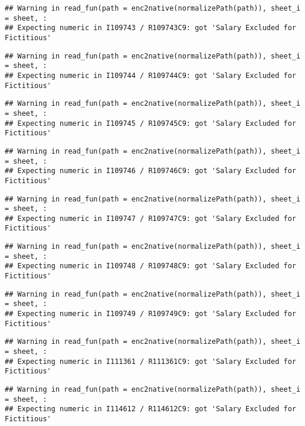 \documentclass[
]{article}
\begin{document}
\begin{verbatim}
## Warning in read_fun(path = enc2native(normalizePath(path)), sheet_i = sheet, :
## Expecting numeric in I109743 / R109743C9: got 'Salary Excluded for Fictitious'
\end{verbatim}

\begin{verbatim}
## Warning in read_fun(path = enc2native(normalizePath(path)), sheet_i = sheet, :
## Expecting numeric in I109744 / R109744C9: got 'Salary Excluded for Fictitious'
\end{verbatim}

\begin{verbatim}
## Warning in read_fun(path = enc2native(normalizePath(path)), sheet_i = sheet, :
## Expecting numeric in I109745 / R109745C9: got 'Salary Excluded for Fictitious'
\end{verbatim}

\begin{verbatim}
## Warning in read_fun(path = enc2native(normalizePath(path)), sheet_i = sheet, :
## Expecting numeric in I109746 / R109746C9: got 'Salary Excluded for Fictitious'
\end{verbatim}

\begin{verbatim}
## Warning in read_fun(path = enc2native(normalizePath(path)), sheet_i = sheet, :
## Expecting numeric in I109747 / R109747C9: got 'Salary Excluded for Fictitious'
\end{verbatim}

\begin{verbatim}
## Warning in read_fun(path = enc2native(normalizePath(path)), sheet_i = sheet, :
## Expecting numeric in I109748 / R109748C9: got 'Salary Excluded for Fictitious'
\end{verbatim}

\begin{verbatim}
## Warning in read_fun(path = enc2native(normalizePath(path)), sheet_i = sheet, :
## Expecting numeric in I109749 / R109749C9: got 'Salary Excluded for Fictitious'
\end{verbatim}

\begin{verbatim}
## Warning in read_fun(path = enc2native(normalizePath(path)), sheet_i = sheet, :
## Expecting numeric in I111361 / R111361C9: got 'Salary Excluded for Fictitious'
\end{verbatim}

\begin{verbatim}
## Warning in read_fun(path = enc2native(normalizePath(path)), sheet_i = sheet, :
## Expecting numeric in I114612 / R114612C9: got 'Salary Excluded for Fictitious'
\end{verbatim}
\end{document}
